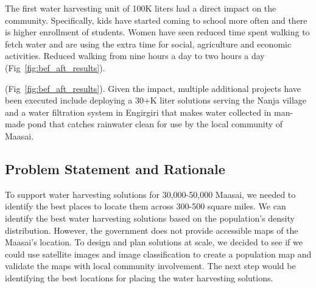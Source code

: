 \documentclass[10pt]{article}
\begin{document}
The first water harvesting unit of 100K liters had a direct impact on the community. Specifically, kids have started coming to school more often and there is higher enrollment of students. Women have seen reduced time spent walking to fetch water and are using the extra time for social, agriculture and economic activities. Reduced walking from nine hours a day to two hours a day (Fig~\ref{fig:bef_aft_results}). 

(Fig~\ref{fig:bef_aft_results}). Given the impact, multiple additional projects have been executed include deploying a 30+K liter solutions serving the Nanja village and a water filtration system in Engirgiri that makes water collected in man-made pond that catches rainwater clean for use by the local community of Maasai.

\subsection{Problem Statement and Rationale}


To support water harvesting solutions for 30,000-50,000 Maasai, we needed to identify the best places to locate them across 300-500 square miles. We can identify the best water harvesting solutions based on the population's density distribution. However, the government does not provide accessible maps of the Maasai's location. To design and plan solutions at scale, we decided to see if we could use satellite images and image classification to create a population map and validate the maps with local community involvement. The next step would be identifying the best locations for placing the water harvesting solutions.



\end{document}
